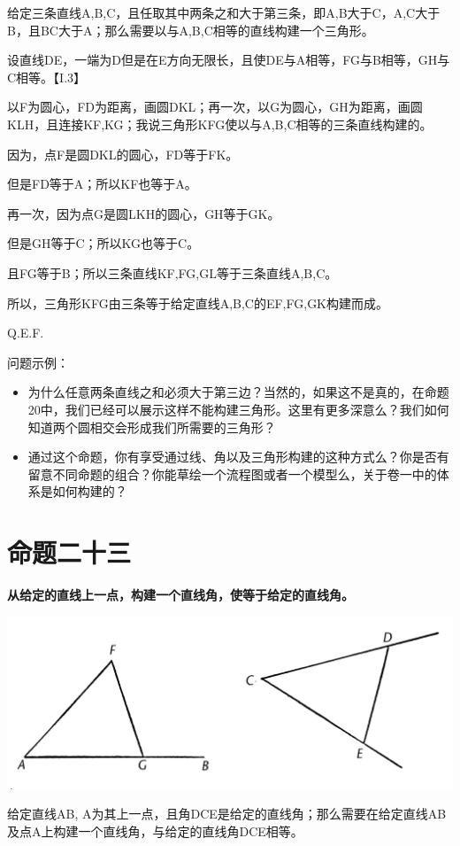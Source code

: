 \documentclass[
]{book}
\providecommand{\tightlist}{%
  \setlength{\itemsep}{0pt}\setlength{\parskip}{0pt}}
\begin{document}
给定三条直线A,B,C，且任取其中两条之和大于第三条，即A,B大于C，A,C大于B，且BC大于A；那么需要以与A,B,C相等的直线构建一个三角形。

设直线DE，一端为D但是在E方向无限长，且使DE与A相等，FG与B相等，GH与C相等。【I.3】

以F为圆心，FD为距离，画圆DKL；再一次，以G为圆心，GH为距离，画圆KLH，且连接KF,KG；我说三角形KFG使以与A,B,C相等的三条直线构建的。

因为，点F是圆DKL的圆心，FD等于FK。

但是FD等于A；所以KF也等于A。

再一次，因为点G是圆LKH的圆心，GH等于GK。

但是GH等于C；所以KG也等于C。

且FG等于B；所以三条直线KF,FG,GL等于三条直线A,B,C。

所以，三角形KFG由三条等于给定直线A,B,C的EF,FG,GK构建而成。

Q.E.F.

问题示例：

\begin{itemize}
\tightlist
\item
  为什么任意两条直线之和必须大于第三边？当然的，如果这不是真的，在命题20中，我们已经可以展示这样不能构建三角形。这里有更多深意么？我们如何知道两个圆相交会形成我们所需要的三角形？
\item
  通过这个命题，你有享受通过线、角以及三角形构建的这种方式么？你是否有留意不同命题的组合？你能草绘一个流程图或者一个模型么，关于卷一中的体系是如何构建的？
\end{itemize}

\hypertarget{ux547dux9898ux4e8cux5341ux4e09}{%
\section{命题二十三}\label{ux547dux9898ux4e8cux5341ux4e09}}

\textbf{从给定的直线上一点，构建一个直线角，使等于给定的直线角。}

\includegraphics[width=0.5\linewidth]{./image/img496}

给定直线AB, A为其上一点，且角DCE是给定的直线角；那么需要在给定直线AB及点A上构建一个直线角，与给定的直线角DCE相等。
\end{document}

